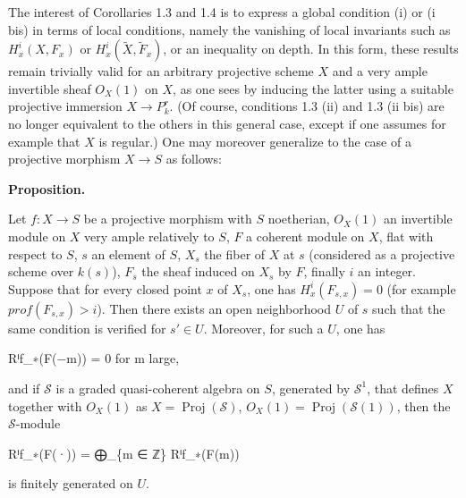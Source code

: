 \documentclass[
]{article}
\newenvironment{Shaded}{}{}
\newcommand{\NormalTok}[1]{#1}
\begin{document}
The interest of Corollaries 1.3 and 1.4 is to express a global condition
(i) or (i bis) in terms of local conditions, namely the vanishing of
local invariants such as \(H^{i}_{x}(X, F_{x})\) or
\(H^{i}_{x}(\tilde{X}, \tilde{F}_{x})\), or an inequality on depth. In
this form, these results remain trivially valid for an arbitrary
projective scheme \(X\) and a very ample invertible sheaf \(O_{X}(1)\)
on \(X\), as one sees by inducing the latter using a suitable projective
immersion \(X \to P^{r}_{k}\). (Of course, conditions 1.3 (ii) and 1.3
(ii bis) are no longer equivalent to the others in this general case,
except if one assumes for example that \(X\) is regular.) One may
moreover generalize to the case of a projective morphism \(X \to S\) as
follows:

\textbf{Proposition.}

Let \(f: X \to S\) be a projective morphism with \(S\) noetherian,
\(O_{X}(1)\) an invertible module on \(X\) very ample relatively to
\(S\), \(F\) a coherent module on \(X\), flat with respect to \(S\),
\(s\) an element of \(S\), \(X_{s}\) the fiber of \(X\) at \(s\)
(considered as a projective scheme over \(k(s)\)), \(F_{s}\) the sheaf
induced on \(X_{s}\) by \(F\), finally \(i\) an integer. Suppose that
for every closed point \(x\) of \(X_{s}\), one has
\(H^{i}_{x}(F_{s,x}) = 0\) (for example \(prof(F_{s,x}) > i\)). Then
there exists an open neighborhood \(U\) of \(s\) such that the same
condition is verified for \(s' \in U\). Moreover, for such a \(U\), one
has

\begin{Shaded}
\begin{Highlighting}[]
\NormalTok{Rⁱf\_∗(F(−m)) = 0 for m large,}
\end{Highlighting}
\end{Shaded}

and if \(\mathcal{S}\) is a graded quasi-coherent algebra on \(S\),
generated by \(\mathcal{S}^{1}\), that defines \(X\) together with
\(O_{X}(1)\) as \(X = \operatorname{Proj}(\mathcal{S})\),
\(O_{X}(1) = \operatorname{Proj}(\mathcal{S}(1))\), then the
\(\mathcal{S}\)-module

\begin{Shaded}
\begin{Highlighting}[]
\NormalTok{Rⁱf\_∗(F(·)) = ⨁\_\{m ∈ ℤ\} Rⁱf\_∗(F(m))}
\end{Highlighting}
\end{Shaded}

is finitely generated on \(U\).
\end{document}
